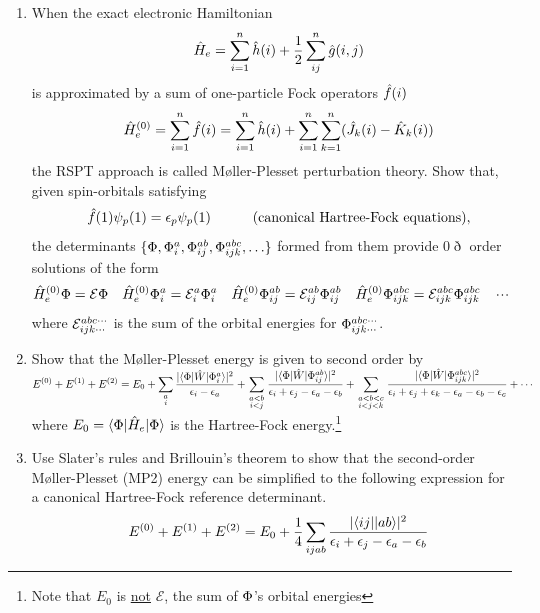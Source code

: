 \documentclass[fleqn,11pt]{article}
\begin{document}
\begin{enumerate}
\item
When the exact electronic Hamiltonian
\begin{align*}
&&
  \hat{H}_e
=
  \sum_{i=1}^n
  \hat{h}(i)
+
  \dfrac{1}{2}
  \sum_{ij}^n
  \hat{g}(i,j)
\end{align*}
is approximated by a sum of one-particle Fock operators $\hat{f}(i)$
\begin{align*}
&&
  \hat{H}_e^{(0)}
=
  \sum_{i=1}^n
  \hat{f}(i)
=
  \sum_{i=1}^n
  \hat{h}(i)
+
  \sum_{i=1}^n
  \sum_{k=1}^n
  (\hat{J}_k(i)-\hat{K}_k(i))
\end{align*}
the RSPT approach is called M\o ller-Plesset perturbation theory.
Show that, given spin-orbitals satisfying 
\begin{align}
&&
  \hat{f}(1)\psi_p(1)
=
  \epsilon_p\psi_p(1)\hspace{30pt} \text{(canonical Hartree-Fock equations)},
\end{align}
the determinants $\{\Phi,\Phi_i^a,\Phi_{ij}^{ab},\Phi_{ijk}^{abc},\ldots\}$ formed from them provide $0\eth$ order solutions of the form
\begin{align}
&
  \hat{H}_e^{(0)}\Phi
=
  \mathcal{E}\Phi
&&
  \hat{H}_e^{(0)}\Phi_i^a
=
  \mathcal{E}_i^a\Phi_i^a
&&
  \hat{H}_e^{(0)}\Phi_{ij}^{ab}
=
  \mathcal{E}_{ij}^{ab}\Phi_{ij}^{ab}
&&
  \hat{H}_e^{(0)}\Phi_{ijk}^{abc}
=
  \mathcal{E}_{ijk}^{abc}\Phi_{ijk}^{abc}
&&
  \mathinner{\mkern-1mu\cdotp\mkern-2mu\cdotp\mkern-2mu\cdotp\mkern-1mu}
\end{align}
where $\mathcal{E}_{ijk\cdots}^{abc\cdots}$ is the sum of the orbital energies for $\Phi_{ijk\cdots}^{abc\cdots}$.

\item Show that the M\o ller-Plesset energy is given to second order by\\[5pt]
$\displaystyle
  E^{(0)}
+
  E^{(1)}
+
  E^{(2)}
=
  E_0
+
  \sum_{\begin{smallmatrix}a\\i\end{smallmatrix}}
  \dfrac{|\langle\Phi|\hat{W}|\Phi_i^a\rangle|^2}{\epsilon_i-\epsilon_a}
+
  \sum_{\begin{smallmatrix}a<b\\i<j\end{smallmatrix}}
  \dfrac{|\langle\Phi|\hat{W}|\Phi_{ij}^{ab}\rangle|^2}{\epsilon_i+\epsilon_j-\epsilon_a-\epsilon_b}
+
  \sum_{\begin{smallmatrix}a<b<c\\i<j<k\end{smallmatrix}}
  \dfrac{|\langle\Phi|\hat{W}|\Phi_{ijk}^{abc}\rangle|^2}{\epsilon_i+\epsilon_j+\epsilon_k-\epsilon_a-\epsilon_b-\epsilon_c}
+
  \cdots
$\\[5pt]
where $E_0=\langle\Phi|\hat{H}_e|\Phi\rangle$ is the Hartree-Fock energy.\footnote{Note that $E_0$ is \underline{not} $\mathcal{E}$, the sum of $\Phi$'s orbital energies}

\item Use Slater's rules and Brillouin's theorem to show that the second-order M\o ller-Plesset (MP2) energy can be simplified to the following expression for a canonical Hartree-Fock reference determinant.
\begin{align}
&&
  E^{(0)}
+
  E^{(1)}
+
  E^{(2)}
=
  E_0
+
  \dfrac{1}{4}
  \sum_{ijab}
  \dfrac{|\langle ij||ab\rangle|^2}{\epsilon_i+\epsilon_j-\epsilon_a-\epsilon_b}
\end{align}
\end{enumerate}
\end{document}
